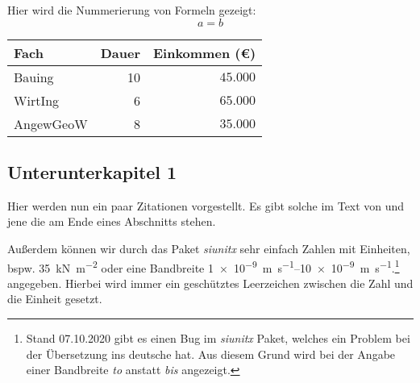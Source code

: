 	Hier wird die Nummerierung von Formeln gezeigt:
	\begin{equation}
		a=b
	\end{equation}
	
	\begin{table}
		\label{tbl:testtest}
		\centering
		\begin{tabular}{lrr} 
			\toprule
			Fach & Dauer & Einkommen (€)\\ 
			\midrule 
			Bauing & 10 & $45.000$ \\
			WirtIng & 6 & $65.000$ \\
			AngewGeoW & 8 & $35.000$\\ 
			\bottomrule
		\end{tabular}
	\end{table}


\subsection{Unterunterkapitel 1}
	Hier werden nun ein paar Zitationen vorgestellt. Es gibt solche im Text von \textcite{alam_effects_2014} und jene die am Ende eines Abschnitts stehen. \parencites{bailey_technology_2018}{alam_effects_2014}{dassault_systemes_abaqus_2017}{dassault_systemes_abaqus_2019}
	
	Außerdem können wir durch das Paket \emph{siunitx} sehr einfach Zahlen mit Einheiten, bspw.	\SI{35}{\kilo\newton\per\square\meter} oder eine Bandbreite \SIrange{1e-9}{10e-9}{\meter\per\second}.\footnote{Stand 07.10.2020 gibt es einen Bug im \emph{siunitx} Paket, welches ein Problem bei der Übersetzung ins deutsche hat. Aus diesem Grund wird bei der Angabe einer Bandbreite \emph{to} anstatt \emph{bis} angezeigt.} angegeben. Hierbei wird immer ein geschütztes Leerzeichen zwischen die Zahl und die Einheit gesetzt.
	
	\blindtext \parencite{alireza_hassanzadegan_thermomechanical_2012}